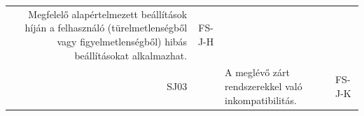 \documentclass[12pt,magyar,a4paper,oneside]{scrreprt}
\begin{document}
\begin{longtable}[]{@{}rcll@{}}
\begin{minipage}[t]{0.69\columnwidth}
Megfelelő alapértelmezett beállítások híján a felhasználó
(türelmetlenségből vagy figyelmetlenségből) hibás beállításokat
alkalmazhat.\strut
\end{minipage} & \begin{minipage}[t]{0.13\columnwidth}\raggedright
FS-J-H\strut
\end{minipage}\tabularnewline
\begin{minipage}[t]{0.03\columnwidth}\raggedleft
SJ03\strut
\end{minipage} & \begin{minipage}[t]{0.03\columnwidth}\centering
1\strut
\end{minipage} & \begin{minipage}[t]{0.69\columnwidth}\raggedright
A meglévő zárt rendszerekkel való inkompatibilitás.\strut
\end{minipage} & \begin{minipage}[t]{0.13\columnwidth}\raggedright
FS-J-K\strut
\end{minipage}\tabularnewline
\bottomrule
\end{longtable}
\end{document}
